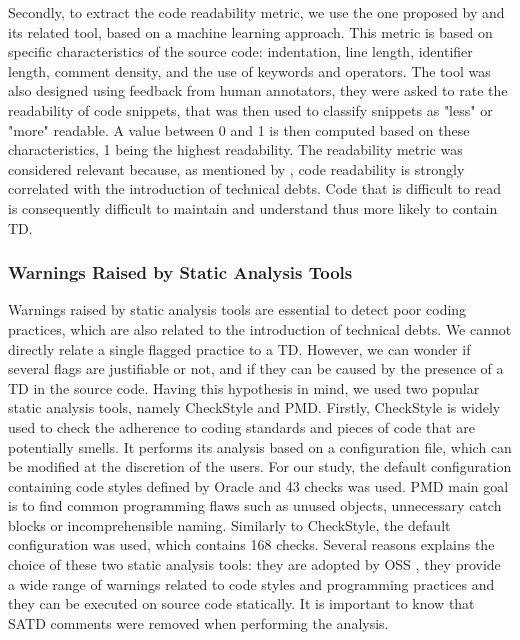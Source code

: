 Secondly, to extract the code readability metric, we use the one proposed by \citet{Buse:tse2010} and its related tool, based on a machine learning approach. This metric is based on specific characteristics of the source code: indentation, line length, identifier length, comment density, and the use of keywords and operators. The tool was also designed using feedback from human annotators, they were asked to rate the readability of code snippets, that was then used to classify snippets as "less" or "more" readable. A value between 0 and 1 is then computed based on these characteristics, 1 being the highest readability. The readability metric was considered relevant because, as mentioned by \citet{BavotaR16}, code readability is strongly correlated with the introduction of technical debts. Code that is difficult to read is consequently difficult to maintain and understand \citep{Buse:tse2010} thus more likely to contain \ac{TD}.

\subsubsection{Warnings Raised by Static Analysis Tools}

Warnings raised by static analysis tools are essential to detect poor coding practices, which are also related to the introduction of technical debts. We cannot directly relate a single flagged practice to a \ac{TD}. However, we can wonder if several flags are justifiable or not, and if they can be caused by the presence of a \ac{TD} in the source code. Having this hypothesis in mind, we used two popular static analysis tools, namely CheckStyle and PMD. Firstly, CheckStyle \citep{checkstyle} is widely used to check the adherence to coding standards and pieces of code that are potentially smells. It performs its analysis based on a configuration file, which can be modified at the discretion of the users. For our study, the default configuration containing code styles defined by Oracle and 43 checks was used. PMD \citep{pmd} main goal is to find common programming flaws such as unused objects, unnecessary catch blocks or incomprehensible naming. Similarly to CheckStyle, the default configuration was used, which contains 168 checks. Several reasons explains the choice of these two static analysis tools: they are adopted by \ac{OSS} \citep{BellerBMZ16}, they provide a wide range of warnings related to code styles and programming practices and they can be executed on source code statically. It is important to know that \ac{SATD} comments were removed when performing the analysis.

